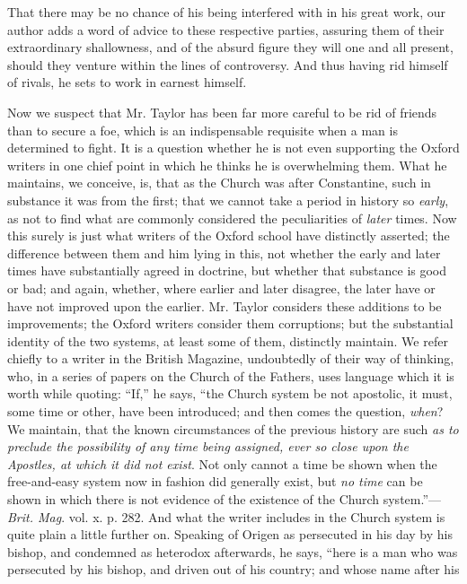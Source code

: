That there may be no chance of his being interfered
with in his great work, our author adds a word of advice to these
respective parties, assuring them of their extraordinary shallowness,
and of the absurd figure they will one and all present, should they
venture within the lines of controversy. And thus having rid himself of
rivals, he sets to work in earnest himself.

Now we suspect that Mr. Taylor has been far more
careful to be rid of friends than to secure a foe, which is an
indispensable requisite when a man is determined to fight. It is a
question whether he is not even supporting the Oxford writers in one
chief point in which he thinks he is overwhelming them. What he
maintains, we conceive, is, that as the Church was after Constantine,
such in substance it was from the first; that we cannot take a period in
history so \emph{early}, as not to find what are commonly considered the
peculiarities of \emph{later} times. Now this surely is just what
writers of the Oxford school have distinctly asserted; the difference
between them and him lying in this, not whether the early and later
times have substantially agreed in doctrine, but whether that substance
is good or bad; and again, whether, where earlier and later disagree,
the later have or have not improved upon the earlier. Mr. Taylor
considers these additions to be improvements; the Oxford writers
consider them corruptions; but the substantial identity of the two
systems, at least some of them, distinctly maintain. We refer chiefly to
a writer in the British Magazine, undoubtedly of their way of thinking,
who, in a series of papers on the Church of the Fathers, uses language
which it is worth while quoting: ``If,'' he says, ``the Church system
be not apostolic, it must, some time or other, have been introduced; and
then comes the question, \emph{when}? We maintain, that the known
circumstances of the previous history are such \emph{as to preclude the
possibility of any time being assigned, ever so close upon the Apostles,
at which it did not exist}. Not only cannot a time be shown when the
free-and-easy system now in fashion did generally exist, but \emph{no time}
can be shown in which there is not evidence of the existence of the
Church system.''—\emph{Brit. Mag}. vol. x. p. 282. And what the writer
includes in the Church system is quite plain a little further on.
Speaking of Origen as persecuted in his day by his bishop, and condemned
as heterodox afterwards, he says, ``here is a man who was persecuted by
his bishop, and driven out of his country; and whose name after his
